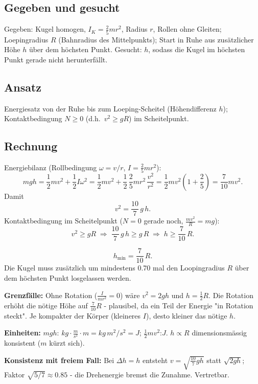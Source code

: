 
\subsection*{Gegeben und gesucht}
Gegeben: Kugel homogen, $I_K=\frac25 m r^2$, Radius $r$, Rollen ohne Gleiten;
Loepingradius $R$ (Bahnradius des Mittelpunkts); Start in Ruhe aus
zusätzlicher Höhe $h$ über dem höchsten Punkt.
Gesucht: $h$, sodass die Kugel im höchsten Punkt gerade nicht herunterfällt.

\subsection*{Ansatz}
Energiesatz von der Ruhe bis zum Loeping-Scheitel (Höhendifferenz $h$);
Kontaktbedingung $N\ge0$ (d.h.\ $v^2\ge gR$) im Scheitelpunkt.

\subsection*{Rechnung}
Energiebilanz (Rollbedingung $\omega=v/r$, $I=\frac25 mr^2$):
\begin{equation}
  m g h = \frac12 m v^2 + \frac12 I \omega^2
  = \frac12 m v^2 + \frac12\,\frac25 m r^2\,\frac{v^2}{r^2}
  = \frac12 m v^2\left(1+\frac25\right)
  = \frac{7}{10} m v^2.
\end{equation}
Damit
\begin{equation}
  v^2 = \frac{10}{7}\,g\,h.
\end{equation}
Kontaktbedingung im Scheitelpunkt ($N=0$ gerade noch,
$\frac{m v^2}{R}=mg$):
\begin{equation}
  v^2 \ge g R
  \;\Rightarrow\;
  \frac{10}{7}\,g\,h \ge g\,R
  \;\Rightarrow\;
  h \ge \frac{7}{10}\,R.
\end{equation}

\begin{ergebnis}
\begin{equation*}
  h_\mathrm{min} = \frac{7}{10}\,R.
\end{equation*}
Die Kugel muss zusätzlich um mindestens \qty{0.70}{} mal den Loopingradius $R$
über dem höchsten Punkt losgelassen werden.
\end{ergebnis}

\begin{kontrolle}
\textbf{Grenzfälle:} Ohne Rotation ($\frac I{mr^2}=0$) wäre $v^2=2gh$ und
$h=\frac12R$. Die Rotation erhöht die nötige Höhe auf $\frac{7}{10}R$ -
plausibel, da ein Teil der Energie "in Rotation steckt". Je kompakter der
Körper (kleineres $I$), desto kleiner das nötige $h$.

\textbf{Einheiten:} $mgh$: $kg\cdot\frac{m}{s^2}\cdot m = kg\,m^2/s^2=J$;
$\frac12 mv^2$:$J$. $h\propto R$ dimensionsmässig konsistent ($m$ kürzt sich). \checkmark

\textbf{Konsistenz mit freiem Fall:} Bei $\Delta h=h$ entsteht $v=\sqrt{\frac{10}{7}gh}$
statt $\sqrt{2gh}$; Faktor $\sqrt{5/7}\approx0.85$ - die Drehenergie bremst die
Zunahme. Vertretbar.
\end{kontrolle}

